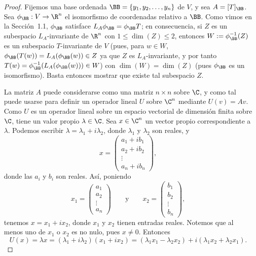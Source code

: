 \begin{proof}
    Fijemos una base ordenada $\BB=\{y_1,y_2,\dots,y_n\}$ de $V$, y sea $A=[T]_{\BB}$. Sea $\phi_{\BB}:V\to\R^n$ el isomorfismo de coordenadas relativo a $\BB$. Como vimos en la Sección~1.1, $\phi_{\BB}$ satisface $L_A\phi_{\BB}=\phi_{\BB}T$; en consecuencia, si $Z$ es un subespacio $L_A$-invariante de $\R^n$ con $1\leq\dim(Z)\leq 2$, entonces $W:=\phi_{\BB}^{-1}(Z)$ es un subespacio $T$-invariante de $V$ (pues, para $w\in W$, $\phi_{\BB}(T(w))=L_A(\phi_{\BB}(w))\in Z$ ya que $Z$ es $L_A$-invariante, y por tanto $T(w)=\phi_{\BB}^{-1}(L_A(\phi_{\BB}(w)))\in W$) con $\dim(W)=\dim(Z)$ (pues $\phi_{\BB}$ es un isomorfismo). Basta entonces mostrar que existe tal subespacio $Z$.

    La matriz $A$ puede considerarse como una matriz $n\times n$ sobre $\C$, y como tal puede usarse para definir un operador lineal $U$ sobre $\C^n$ mediante $U(v)=Av$. Como $U$ es un operador lineal sobre un espacio vectorial de dimensión finita sobre $\C$, tiene un valor propio $\lambda\in\C$. Sea $x\in\C^n$ un vector propio correspondiente a $\lambda$. Podemos escribir $\lambda=\lambda_1+i\lambda_2$, donde $\lambda_1$ y $\lambda_2$ son reales, y
    \begin{equation*}
        x=\begin{pmatrix}a_1+ib_1\\a_2+ib_2\\\vdots\\a_n+ib_n\end{pmatrix},
    \end{equation*}
    donde las $a_i$ y $b_i$ son reales. Así, poniendo
    \begin{equation*}
        x_1=\begin{pmatrix}a_1\\a_2\\\vdots\\a_n\end{pmatrix} \qquad\text{y}\qquad x_2=\begin{pmatrix}b_1\\b_2\\\vdots\\b_n\end{pmatrix},
    \end{equation*}
    tenemos $x=x_1+ix_2$, donde $x_1$ y $x_2$ tienen entradas reales. Notemos que al menos uno de $x_1$ o $x_2$ es no nulo, pues $x\neq 0$. Entonces
    \begin{equation*}
        U(x)=\lambda x=(\lambda_1+i\lambda_2)(x_1+ix_2)=(\lambda_1x_1-\lambda_2x_2)+i(\lambda_1x_2+\lambda_2x_1).

\end{equation*}
\end{proof}
